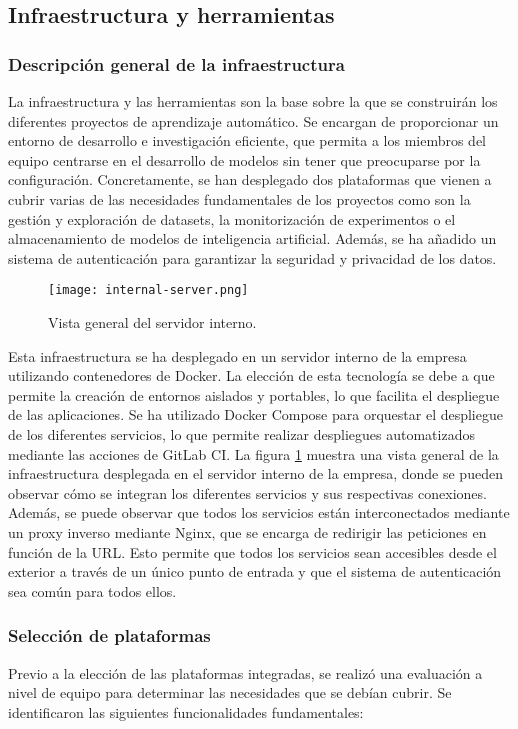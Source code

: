 \subsection{Infraestructura y herramientas}
\subsubsection{Descripción general de la infraestructura}
La infraestructura y las herramientas son la base sobre la que se construirán
los diferentes proyectos de aprendizaje automático. Se encargan de proporcionar
un entorno de desarrollo e investigación eficiente, que permita a los miembros
del equipo centrarse en el desarrollo de modelos sin tener que preocuparse por
la configuración. Concretamente, se han desplegado dos plataformas 
que vienen a cubrir varias de las necesidades fundamentales de los proyectos
como son la gestión y exploración de datasets, la monitorización de experimentos o
el almacenamiento de modelos de inteligencia artificial. Además, se ha añadido un sistema de autenticación 
para garantizar la seguridad y privacidad de los datos.\medskip

\begin{figure}[!h]
    \centering
    \texttt{[image: internal-server.png]}
    \caption{Vista general del servidor interno.}\label{fig:internal-server}
\end{figure}

Esta infraestructura se ha desplegado en un servidor interno de la empresa
utilizando contenedores de Docker. La elección de esta tecnología se debe a
que permite la creación de entornos aislados y portables, lo que facilita el
despliegue de las aplicaciones. Se ha utilizado Docker Compose para
orquestar el despliegue de los diferentes servicios, lo que permite
realizar despliegues automatizados mediante las acciones de GitLab CI. La
figura \ref{fig:internal-server} muestra una vista general de la infraestructura
desplegada en el servidor interno de la empresa, donde se pueden observar
cómo se integran los diferentes servicios y sus respectivas conexiones. Además,
se puede observar que todos los servicios están interconectados mediante un
proxy inverso mediante Nginx, que se encarga de redirigir las peticiones en 
función de la URL. Esto permite que todos los servicios sean
accesibles desde el exterior a través de un único punto de entrada y que el
sistema de autenticación sea común para todos ellos.

\subsubsection{Selección de plataformas}
Previo a la elección de las plataformas integradas, se realizó una evaluación
a nivel de equipo para determinar las necesidades que se debían cubrir. Se
identificaron las siguientes funcionalidades fundamentales:

